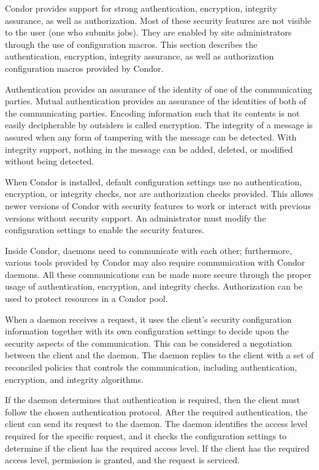 Condor provides support for strong authentication,
encryption, integrity assurance, as well as authorization.
Most of these security features are not visible to the user
(one who submits jobs).
They are enabled by site administrators through the use of
configuration macros.
This section describes the authentication, encryption,
integrity assurance, as well as authorization configuration
macros provided by Condor.

Authentication provides an assurance of the identity of one of the
communicating parties.
Mutual authentication provides an assurance of the identities of
both of the communicating parties.
Encoding information such that its contents is not easily
decipherable by outsiders is called encryption.
The integrity of a message is assured when any form of
tampering with the message can be detected. 
With integrity support,
nothing in the message can be added, deleted, or modified
without being detected.

When Condor is installed, default configuration settings
use no authentication, encryption, or integrity checks,
nor are authorization checks provided.
This allows newer versions of Condor with
security features to work or interact
with previous versions without security support.
An administrator must modify the configuration settings to
enable the security features.

Inside Condor, daemons need to communicate with each other;
furthermore, various tools provided by Condor may also
require communication with Condor daemons.
All these communications can be made more secure
through the proper usage of authentication, encryption,
and integrity checks.
Authorization can be used to protect resources in a Condor pool.

When a daemon receives a request,
it uses the client's security configuration information
together with its own configuration settings to decide upon
the security aspects of the communication.
This can be considered a negotiation between the client and
the daemon.
The daemon replies to the client with 
a set of reconciled policies that controls the communication,
including authentication, encryption,
and integrity algorithms.

If the daemon determines that authentication is required, then the
client must follow the chosen authentication protocol.
After the required authentication, the client can send its
request to the daemon. 
The daemon identifies the access level required for the specific
request,
and it checks the configuration settings to determine if the client 
has the required access level.
If the client has the required access level,
permission is granted, and the request is serviced. 

